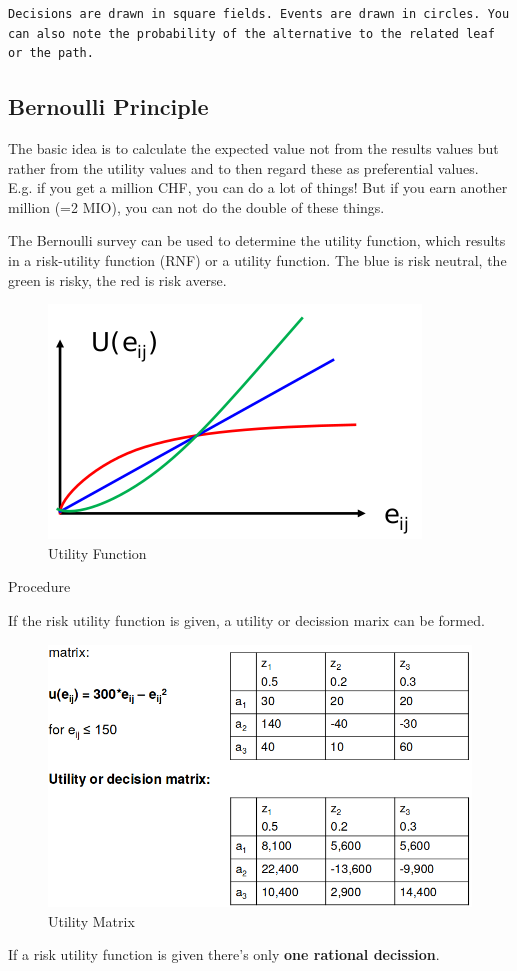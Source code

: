 \begin{verbatim}
Decisions are drawn in square fields. Events are drawn in circles. You can also note the probability of the alternative to the related leaf or the path.
\end{verbatim}

\hypertarget{bernoulli-principle}{%
\subsection{Bernoulli Principle}\label{bernoulli-principle}}

The basic idea is to calculate the expected value not from the results
values but rather from the utility values and to then regard these as
preferential values.\\
E.g. if you get a million CHF, you can do a lot of things! But if you
earn another million (=2 MIO), you can not do the double of these
things.

The Bernoulli survey can be used to determine the utility function,
which results in a risk-utility function (RNF) or a utility function.
The blue is risk neutral, the green is risky, the red is risk averse.

\begin{figure}
\centering
\includegraphics{figures/utilityFunction.png}
\caption{Utility Function}
\end{figure}

Procedure

If the risk utility function is given, a utility or decission marix can
be formed.

\begin{figure}
\centering
\includegraphics{figures/utilitymatrix.png}
\caption{Utility Matrix}
\end{figure}

If a risk utility function is given there's only \textbf{one rational
decission}.
